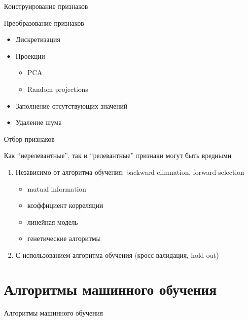 \documentclass[10pt]{beamer}
\begin{document}
\begin{frame}{Конструирование признаков}

\end{frame}

\begin{frame}{Преобразование признаков}

\begin{itemize}
\item Дискретизация
\item Проекции
	\begin{itemize}
	\item PCA
	\item Random projections
	\end{itemize}
\item Заполнение отсутствующих значений
\item Удаление шума
\end{itemize}

\end{frame}

\begin{frame}{Отбор признаков}

Как ``нерелевантные'', так и ``релевантные'' признаки могут быть вредными

\begin{enumerate}
\item Независимо от алгоритма обучения: backward elimnation, forward selection
	\begin{itemize}	
	\item mutual information	
	\item коэффициент корреляции
	\item линейная модель
	\item генетические алгоритмы
	\end{itemize}
\item С использованием алгоритма обучения (кросс-валидация, hold-out)
\end{enumerate}

\end{frame}


\section{Алгоритмы машинного обучения}


\begin{frame}{}

\begin{center}
\Large Алгоритмы машинного обучения
\end{center}

\end{frame}
\end{document}
